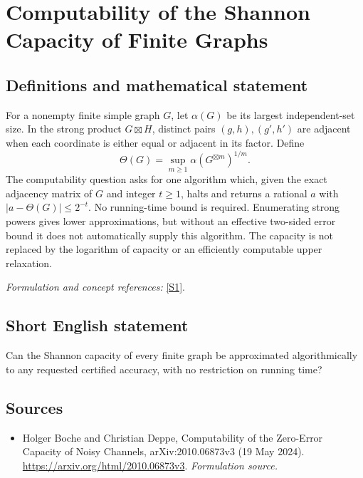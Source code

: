 \documentclass[11pt]{article}
\begin{document}
\section*{\texorpdfstring{Computability of the Shannon Capacity of Finite Graphs}{Computability of the Shannon Capacity of Finite Graphs}}\label{30006913}
\subsection{Definitions and mathematical statement}
For a nonempty finite simple graph $G$, let $\alpha(G)$ be its largest independent-set size. In the strong product $G\boxtimes H$, distinct pairs $(g,h),(g',h')$ are adjacent when each coordinate is either equal or adjacent in its factor. Define
\[
 \Theta(G)=\sup_{m\ge1}\alpha(G^{\boxtimes m})^{1/m}.
\]
The computability question asks for one algorithm which, given the exact adjacency matrix of $G$ and integer $t\ge1$, halts and returns a rational $a$ with $|a-\Theta(G)|\le2^{-t}$. No running-time bound is required. Enumerating strong powers gives lower approximations, but without an effective two-sided error bound it does not automatically supply this algorithm. The capacity is not replaced by the logarithm of capacity or an efficiently computable upper relaxation.
\par\smallskip\textit{Formulation and concept references:} \href{https://arxiv.org/html/2010.06873v3}{[S1]}.

\subsection{Short English statement}
Can the Shannon capacity of every finite graph be approximated algorithmically to any requested certified accuracy, with no restriction on running time?
\subsection{Sources}
\begin{itemize}
\item[S1]Holger Boche and Christian Deppe, Computability of the Zero-Error Capacity of Noisy Channels, arXiv:2010.06873v3 (19 May 2024).
\url{https://arxiv.org/html/2010.06873v3}.
\textit{Formulation source.}
\end{itemize}
\end{document}

